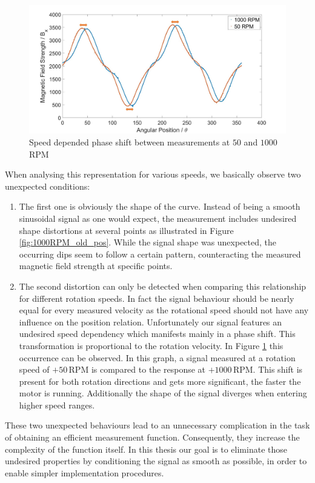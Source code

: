\documentclass[english]{isasthesis}
\begin{document}
     \begin{figure}[p]
                \centering
                \includegraphics[width=1\textwidth]{figures/phaseshift_50_1000.jpg}
                \caption{Speed depended phase shift between measurements at $50$ and $1000\,$RPM}
                \label{fig:phase_shift_50_1000}
     \end{figure}
     When analysing this representation for various speeds, we basically observe two unexpected conditions: 
     \begin{enumerate}
     	\item The first one is obviously the shape of the curve. Instead of being a smooth sinusoidal signal as one would expect, the measurement includes undesired shape distortions at several points as illustrated in Figure \ref{fig:1000RPM_old_pos}. While the signal shape was unexpected, the occurring dips seem to follow a certain pattern, counteracting the measured magnetic field strength at specific points. 
     	\item The second distortion can only be detected when comparing this relationship for different rotation speeds. In fact the signal behaviour should be nearly equal for every measured velocity as the rotational speed should not have any influence on the position relation. Unfortunately our signal features an undesired speed dependency which manifests mainly in a phase shift. This transformation is proportional to the rotation velocity. In Figure \ref{fig:phase_shift_50_1000} this occurrence can be observed. In this graph, a signal measured at a rotation speed of $+50\,$RPM is compared to the response at $+1000\,$RPM. This shift is present for both rotation directions and gets more significant, the faster the motor is running. Additionally the shape of the signal diverges when entering higher speed ranges.
     \end{enumerate}
     These two unexpected behaviours lead to an unnecessary complication in the task of obtaining an efficient measurement function. Consequently, they increase the complexity of the function itself. In this thesis our goal is to eliminate those undesired properties by conditioning the signal as smooth as possible, in order to enable simpler implementation procedures.\\ \\         
\end{document}
